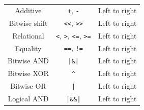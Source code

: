 \documentclass{report}
\begin{document}
\begin{table}[H]
\begin{tabular}{c c c}
        Additive                      & \texttt{+}, \texttt{-}                                                                                                                                                                                      & Left to right                  \\
        Bitwise shift                 & \texttt{<<}, \texttt{>>}                                                                                                                                                                                    & Left to right                  \\
        Relational                    & \texttt{<}, \texttt{>}, \texttt{<=}, \texttt{>=}                                                                                                                                              & Left to right                  \\
        Equality                      & \texttt{==}, \texttt{!=}                                                                                                                                                                                    & Left to right                  \\
        Bitwise AND                   & \texttt{|\&|}                                                                                                                                                                                     & Left to right                  \\
        Bitwise XOR                   & \texttt{^}                                                                                                                                                                                                         & Left to right                  \\
        Bitwise OR                    & \texttt{|}                                                                                                                                                                                                         & Left to right                  \\
        Logical AND                   & \texttt{|\&\&|}                                                                                                                                                                                   & Left to right                  \\

\end{tabular}
\end{table}
\end{document}
